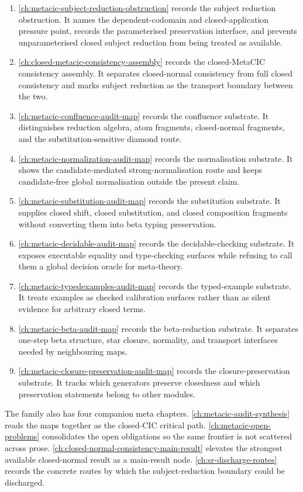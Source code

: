 \begin{enumerate}
\item \autoref{ch:metacic-subject-reduction-obstruction} records the subject
reduction obstruction. It names the dependent-codomain and closed-application
pressure point, records the parameterised preservation interface, and prevents
unparameterised closed subject reduction from being treated as available.
\item \autoref{ch:closed-metacic-consistency-assembly} records the
closed-MetaCIC consistency assembly. It separates closed-normal consistency
from full closed consistency and marks subject reduction as the transport
boundary between the two.
\item \autoref{ch:metacic-confluence-audit-map} records the confluence
substrate. It distinguishes reduction algebra, atom fragments, closed-normal
fragments, and the substitution-sensitive diamond route.
\item \autoref{ch:metacic-normalization-audit-map} records the normalisation
substrate. It shows the candidate-mediated strong-normalisation route and
keeps candidate-free global normalisation outside the present claim.
\item \autoref{ch:metacic-substitution-audit-map} records the substitution
substrate. It supplies closed shift, closed substitution, and closed
composition fragments without converting them into beta typing preservation.
\item \autoref{ch:metacic-decidable-audit-map} records the decidable-checking
substrate. It exposes executable equality and type-checking surfaces while
refusing to call them a global decision oracle for meta-theory.
\item \autoref{ch:metacic-typedexamples-audit-map} records the typed-example
substrate. It treats examples as checked calibration surfaces rather than as
silent evidence for arbitrary closed terms.
\item \autoref{ch:metacic-beta-audit-map} records the beta-reduction
substrate. It separates one-step beta structure, star closure, normality, and
transport interfaces needed by neighbouring maps.
\item \autoref{ch:metacic-closure-preservation-audit-map} records the
closure-preservation substrate. It tracks which generators preserve closedness
and which preservation statements belong to other modules.
\end{enumerate}

The family also has four companion meta chapters.
\autoref{ch:metacic-audit-synthesis} reads the maps together as the
closed-CIC critical path. \autoref{ch:metacic-open-problems} consolidates the
open obligations so the same frontier is not scattered across prose.
\autoref{ch:closed-normal-consistency-main-result} elevates the strongest
available closed-normal result as a main-result node.
\autoref{ch:sr-discharge-routes} records the concrete routes by which the
subject-reduction boundary could be discharged.

